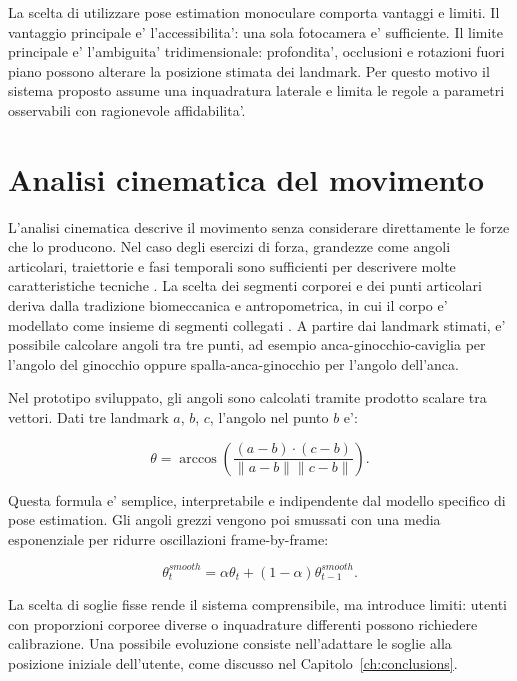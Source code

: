 La scelta di utilizzare pose estimation monoculare comporta vantaggi e limiti. Il vantaggio principale e' l'accessibilita': una sola fotocamera e' sufficiente. Il limite principale e' l'ambiguita' tridimensionale: profondita', occlusioni e rotazioni fuori piano possono alterare la posizione stimata dei landmark. Per questo motivo il sistema proposto assume una inquadratura laterale e limita le regole a parametri osservabili con ragionevole affidabilita'.

\section{Analisi cinematica del movimento}

L'analisi cinematica descrive il movimento senza considerare direttamente le forze che lo producono. Nel caso degli esercizi di forza, grandezze come angoli articolari, traiettorie e fasi temporali sono sufficienti per descrivere molte caratteristiche tecniche \cite{winter2009biomechanics,zatsiorsky2002kinetics}. La scelta dei segmenti corporei e dei punti articolari deriva dalla tradizione biomeccanica e antropometrica, in cui il corpo e' modellato come insieme di segmenti collegati \cite{dempster1955space}. A partire dai landmark stimati, e' possibile calcolare angoli tra tre punti, ad esempio anca-ginocchio-caviglia per l'angolo del ginocchio oppure spalla-anca-ginocchio per l'angolo dell'anca.

Nel prototipo sviluppato, gli angoli sono calcolati tramite prodotto scalare tra vettori. Dati tre landmark $a$, $b$, $c$, l'angolo nel punto $b$ e':

\begin{equation}
\theta = \arccos \left(
\frac{(a-b) \cdot (c-b)}
{\|a-b\| \|c-b\|}
\right).
\end{equation}

Questa formula e' semplice, interpretabile e indipendente dal modello specifico di pose estimation. Gli angoli grezzi vengono poi smussati con una media esponenziale per ridurre oscillazioni frame-by-frame:

\begin{equation}
\theta_t^{smooth} = \alpha \theta_t + (1-\alpha)\theta_{t-1}^{smooth}.
\end{equation}

La scelta di soglie fisse rende il sistema comprensibile, ma introduce limiti: utenti con proporzioni corporee diverse o inquadrature differenti possono richiedere calibrazione. Una possibile evoluzione consiste nell'adattare le soglie alla posizione iniziale dell'utente, come discusso nel Capitolo~\ref{ch:conclusions}.

